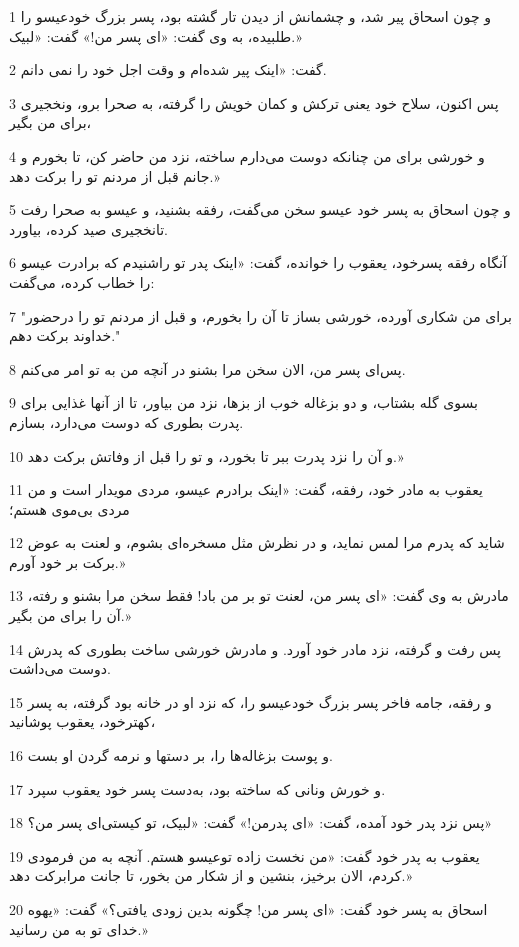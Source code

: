 \par 1 و چون اسحاق پیر شد، و چشمانش از دیدن تار گشته بود، پسر بزرگ خودعیسو را طلبیده، به وی گفت: «ای پسر من!» گفت: «لبیک.»
\par 2 گفت: «اینک پیر شده‌ام و وقت اجل خود را نمی دانم.
\par 3 پس اکنون، سلاح خود یعنی ترکش و کمان خویش را گرفته، به صحرا برو، ونخجیری برای من بگیر،
\par 4 و خورشی برای من چنانکه دوست می‌دارم ساخته، نزد من حاضر کن، تا بخورم و جانم قبل از مردنم تو را برکت دهد.»
\par 5 و چون اسحاق به پسر خود عیسو سخن می‌گفت، رفقه بشنید، و عیسو به صحرا رفت تانخجیری صید کرده، بیاورد.
\par 6 آنگاه رفقه پسرخود، یعقوب را خوانده، گفت: «اینک پدر تو راشنیدم که برادرت عیسو را خطاب کرده، می‌گفت:
\par 7 "برای من شکاری آورده، خورشی بساز تا آن را بخورم، و قبل از مردنم تو را درحضور خداوند برکت دهم."
\par 8 پس‌ای پسر من، الان سخن مرا بشنو در آنچه من به تو امر می‌کنم.
\par 9 بسوی گله بشتاب، و دو بزغاله خوب از بزها، نزد من بیاور، تا از آنها غذایی برای پدرت بطوری که دوست می‌دارد، بسازم.
\par 10 و آن را نزد پدرت ببر تا بخورد، و تو را قبل از وفاتش برکت دهد.»
\par 11 یعقوب به مادر خود، رفقه، گفت: «اینک برادرم عیسو، مردی مویدار است و من مردی بی‌موی هستم؛
\par 12 شاید که پدرم مرا لمس نماید، و در نظرش مثل مسخره‌ای بشوم، و لعنت به عوض برکت بر خود آورم.»
\par 13 مادرش به وی گفت: «ای پسر من، لعنت تو بر من باد! فقط سخن مرا بشنو و رفته، آن را برای من بگیر.»
\par 14 پس رفت و گرفته، نزد مادر خود آورد. و مادرش خورشی ساخت بطوری که پدرش دوست می‌داشت.
\par 15 و رفقه، جامه فاخر پسر بزرگ خودعیسو را، که نزد او در خانه بود گرفته، به پسر کهترخود، یعقوب پوشانید،
\par 16 و پوست بزغاله‌ها را، بر دستها و نرمه گردن او بست.
\par 17 و خورش ونانی که ساخته بود، به‌دست پسر خود یعقوب سپرد.
\par 18 پس نزد پدر خود آمده، گفت: «ای پدرمن!» گفت: «لبیک، تو کیستی‌ای پسر من؟»
\par 19 یعقوب به پدر خود گفت: «من نخست زاده توعیسو هستم. آنچه به من فرمودی کردم، الان برخیز، بنشین و از شکار من بخور، تا جانت مرابرکت دهد.»
\par 20 اسحاق به پسر خود گفت: «ای پسر من! چگونه بدین زودی یافتی؟» گفت: «یهوه خدای تو به من رسانید.»
